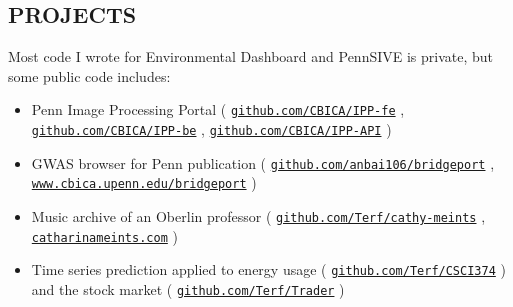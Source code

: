\documentclass[margin]{res}
\newcommand\rurl[1]{%
  \href{http://#1}{\nolinkurl{#1}}%
}
\begin{document}
\begin{resume}
\section{PROJECTS}
Most code I wrote for Environmental Dashboard and PennSIVE is private, but some public code includes:
\begin{itemize}
    \item Penn Image Processing Portal (\rurl{github.com/CBICA/IPP-fe}, \rurl{github.com/CBICA/IPP-be}, \rurl{github.com/CBICA/IPP-API})
    \item GWAS browser for Penn publication (\rurl{github.com/anbai106/bridgeport},\\ \rurl{www.cbica.upenn.edu/bridgeport})
    \item Music archive of an Oberlin professor (\rurl{github.com/Terf/cathy-meints},\\ \rurl{catharinameints.com})
    \item Time series prediction applied to energy usage (\rurl{github.com/Terf/CSCI374}) and the stock market (\rurl{github.com/Terf/Trader})
\end{itemize}





\end{resume}
\end{document}
